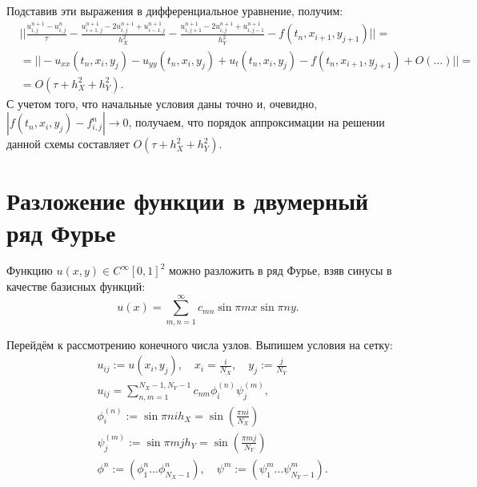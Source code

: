 \documentclass[14pt,a4paper]{extarticle}
\newcommand{\1}{\mathbbm{1}}
\begin{document}
Подставив эти выражения в дифференциальное уравнение, получим:
\begin{align*}
    &||\frac{u_{i, j}^{n+1} - u_{i, j}^n}{\tau} - \frac{u_{i+1, j}^{n+1} - 2 u_{i, j}^{n+1} + u_{i-1, j}^{n+1}}{h_X^2} - 
    \frac{u_{i, j+1}^{n+1} - 2 u_{i, j}^{n+1} + u_{i, j-1}^{n+1}}{h_Y^2} - f(t_{n}, x_{i+1}, y_{j+1})|| = \\
    &= ||- u_{xx}(t_n, x_{i}, y_j) - u_{yy}(t_n, x_{i}, y_j) + u_t(t_{n}, x_i, y_j) - f(t_{n}, x_{i+1}, y_{j+1}) + O(\ldots)||=\\ &=
     O(\tau + h_X^2 + h_Y^2).
\end{align*}
С учетом того, что начальные условия даны точно и, очевидно, $|f(t_n, x_i, y_j) - f_{i,j}^n| \rightarrow 0$, получаем, что порядок аппроксимации на решении 
данной схемы составляет $O(\tau + h_X^2 + h_Y^2)$.

\section{Разложение функции в двумерный ряд Фурье}
Функцию $u(x, y) \in C^{\infty}[0, 1]^2$ можно разложить в ряд Фурье,
взяв синусы в качестве базисных функций:
\begin{equation*}
    u(x) = \sum_{m, n = 1}^{\infty} c_{mn} \sin {\pi m x} \sin {\pi n y}.
\end{equation*}
\par
Перейдём к рассмотрению конечного числа узлов. Выпишем условия на сетку:
\begin{align*}
     & u_{ij} := u(x_i, y_j), \quad x_i = \frac{i}{N_X}, \quad y_j := \frac{j}{N_Y}\\
     & u_{ij} = \sum_{n, m = 1}^{N_X-1, N_Y-1} c_{nm} \phi_i^{(n)} \psi_j^{(m)},                                    \\
     & \phi_i^{(n)} := \sin{\pi n i h_X} = \sin\left(\frac{\pi n i}{N_X}\right) \\
     & \psi_j^{(m)} := \sin{\pi m j h_Y} = \sin\left(\frac{\pi m j}{N_Y}\right) \\
     & \phi^n := (\phi_1^n ... \phi_{N_X-1}^n), \quad \psi^m := (\psi_1^m ... \psi_{N_Y-1}^m).
\end{align*}

\end{document}
